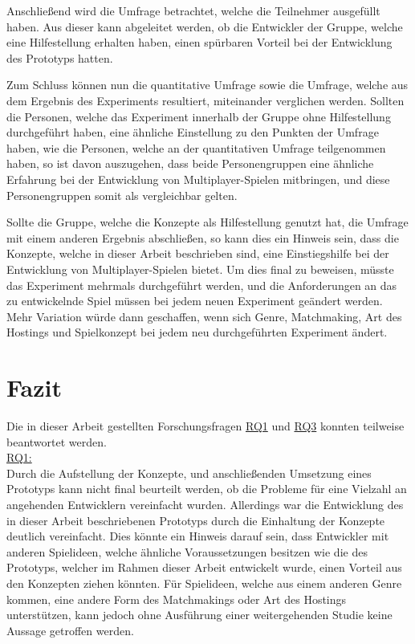 Anschließend wird die Umfrage betrachtet, welche die Teilnehmer ausgefüllt haben. Aus dieser kann abgeleitet werden, ob die Entwickler der Gruppe, welche eine Hilfestellung erhalten haben, einen spürbaren Vorteil bei der Entwicklung des Prototyps hatten.

Zum Schluss können nun die quantitative Umfrage sowie die Umfrage, welche aus dem Ergebnis des Experiments resultiert, miteinander verglichen werden. Sollten die Personen, welche das Experiment innerhalb der Gruppe ohne Hilfestellung durchgeführt haben, eine ähnliche Einstellung zu den Punkten der Umfrage haben, wie die Personen, welche an der quantitativen Umfrage teilgenommen haben, so ist davon auszugehen, dass beide Personengruppen eine ähnliche Erfahrung bei der Entwicklung von Multiplayer-Spielen mitbringen, und diese Personengruppen somit als vergleichbar gelten.

Sollte die Gruppe, welche die Konzepte als Hilfestellung genutzt hat, die Umfrage mit einem anderen Ergebnis abschließen, so kann dies ein Hinweis sein, dass die Konzepte, welche in dieser Arbeit beschrieben sind, eine Einstiegshilfe bei der Entwicklung von Multiplayer-Spielen bietet. Um dies final zu beweisen, müsste das Experiment mehrmals durchgeführt werden, und die Anforderungen an das zu entwickelnde Spiel müssen bei jedem neuen Experiment geändert werden. Mehr Variation würde dann geschaffen, wenn sich Genre, Matchmaking, Art des Hostings und Spielkonzept bei jedem neu durchgeführten Experiment ändert.


\section{Fazit}

Die in dieser Arbeit gestellten Forschungsfragen \hyperref[RQ1]{RQ1} und \hyperref[RQ3]{RQ3} konnten teilweise beantwortet werden. \\
\hyperref[RQ1]{RQ1:} \\
Durch die Aufstellung der Konzepte, und anschließenden Umsetzung eines Prototyps kann nicht final beurteilt werden, ob die Probleme für eine Vielzahl an angehenden Entwicklern vereinfacht wurden. Allerdings war die Entwicklung des in dieser Arbeit beschriebenen Prototyps durch die Einhaltung der Konzepte deutlich vereinfacht. Dies könnte ein Hinweis darauf sein, dass Entwickler mit anderen Spielideen, welche ähnliche Voraussetzungen besitzen wie die des Prototyps, welcher im Rahmen dieser Arbeit entwickelt wurde, einen Vorteil aus den Konzepten ziehen könnten. Für Spielideen, welche aus einem anderen Genre kommen, eine andere Form des Matchmakings oder Art des Hostings unterstützen, kann jedoch ohne Ausführung einer weitergehenden Studie keine Aussage getroffen werden.

